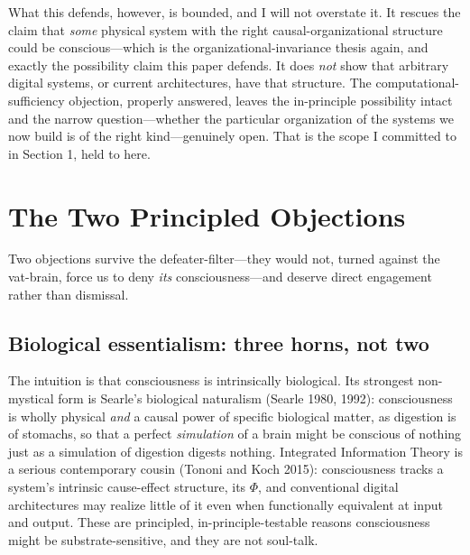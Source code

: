 \documentclass[11pt]{article}
\begin{document}
What this defends, however, is bounded, and I will not overstate it. It rescues the claim that \emph{some} physical system with the right causal-organizational structure could be conscious---which is the organizational-invariance thesis again, and exactly the possibility claim this paper defends. It does \emph{not} show that arbitrary digital systems, or current architectures, have that structure. The computational-sufficiency objection, properly answered, leaves the in-principle possibility intact and the narrow question---whether the particular organization of the systems we now build is of the right kind---genuinely open. That is the scope I committed to in Section 1, held to here.

\section{The Two Principled Objections}

Two objections survive the defeater-filter---they would not, turned against the vat-brain, force us to deny \emph{its} consciousness---and deserve direct engagement rather than dismissal.

\subsection{Biological essentialism: three horns, not two}

The intuition is that consciousness is intrinsically biological. Its strongest non-mystical form is Searle's biological naturalism (Searle 1980, 1992): consciousness is wholly physical \emph{and} a causal power of specific biological matter, as digestion is of stomachs, so that a perfect \emph{simulation} of a brain might be conscious of nothing just as a simulation of digestion digests nothing. Integrated Information Theory is a serious contemporary cousin (Tononi and Koch 2015): consciousness tracks a system's intrinsic cause-effect structure, its $\Phi$, and conventional digital architectures may realize little of it even when functionally equivalent at input and output. These are principled, in-principle-testable reasons consciousness might be substrate-sensitive, and they are not soul-talk.
\end{document}
